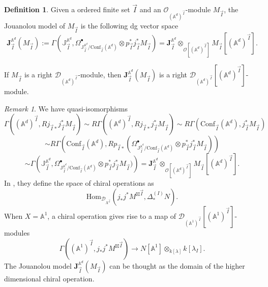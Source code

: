 \documentclass[11pt]{amsart}
\theoremstyle{definition}
\newtheorem{defn}[thm]{Definition}
\theoremstyle{remark}
\newtheorem{rem}[thm]{Remark}
\numberwithin{equation}{section}
\begin{document}
\begin{defn}
Given a ordered finite set $\vec{I}$ and an $\mathcal{O}_{(\mathbb{A}^d)^{\vec{I}}}$-module $M_{\vec{I}}$, the Jouanolou model of $M_{\vec{I}}$ is the following dg vector space
$$
\mathbf{J}^{\mathbb{A}^d}_{\vec{I}}(M_{\vec{I}}):=\Gamma\left(\mathbb{J}^{\mathbb{A}^d}_{\vec{I}},\Omega^{\bullet}_{\mathbb{J}^{\mathbb{A}^d}_{\vec{I}}/\mathrm{Conf}_{\vec{I}}(\mathbb{A}^d)}\otimes p^*_{\vec{I}}j^*_{\vec{I}}M_{\vec{I}} \right)=\mathbf{J}^{\mathbb{A}^d}_{\vec{I}}\otimes_{\mathcal{O}[(\mathbb{A}^d)^{\vec{I}}]}M_{\vec{I}}[(\mathbb{A}^d)^{\vec{I}}].
$$

If $M_{\vec{I}}$ is a right $\mathcal{D}_{(\mathbb{A}^d)^{\vec{I}}}$-module, then $\mathbf{J}^{\mathbb{A}^d}_{\vec{I}}(M_{\vec{I}})$ is a right $\mathcal{D}_{(\mathbb{A}^d)^{\vec{I}}}[(\mathbb{A}^d)^{\vec{I}}]$-module.
\end{defn}

\begin{rem}
    We have quasi-isomorphisms
    $$
\Gamma\left((\mathbb{A}^d)^{\vec{I}},Rj_{\vec{I}*}j^*_{\vec{I}}M_{\vec{I}}\right)\sim R\Gamma\left((\mathbb{A}^d)^{\vec{I}},Rj_{\vec{I}*}j^*_{\vec{I}}M_{\vec{I}}\right)\sim R\Gamma\left(\mathrm{Conf}_{\vec{I}}(\mathbb{A}^d),j^*_{\vec{I}}M_{\vec{I}}\right)
    $$
    $$
    \sim R\Gamma\left(\mathrm{Conf}_{\vec{I}}(\mathbb{A}^d),Rp_{\vec{I}*}(\Omega^{\bullet}_{\mathbb{J}^{\mathbb{A}^d}_{\vec{I}}/\mathrm{Conf}_{\vec{I}}(\mathbb{A}^d)}\otimes p^*_{\vec{I}}j^*_{\vec{I}}M_{\vec{I}})\right)
    $$
    $$
    \sim \Gamma\left(\mathbb{J}^{\mathbb{A}^d}_{\vec{I}},\Omega^{\bullet}_{\mathbb{J}^{\mathbb{A}^d}_{\vec{I}}/\mathrm{Conf}_{\vec{I}}(\mathbb{A}^d)}\otimes p^*_{\vec{I}}j^*_{\vec{I}}M_{\vec{I}}) \right)=\mathbf{J}^{\mathbb{A}^d}_{\vec{I}}\otimes_{\mathcal{O}[(\mathbb{A}^d)^{\vec{I}}]}M_{\vec{I}}[(\mathbb{A}^d)^{\vec{I}}].
    $$
    In \cite{beilinson2004chiral}, they define the space of chiral operations as
    $$
    \mathrm{Hom}_{\mathcal{D}_{X^{\vec{I}}}}\left(j_{*}j^*M^{\boxtimes\vec{I}},\Delta^{(I)}_*N\right).
    $$
    When $X=\mathbb{A}^1$, a chiral operation gives rise to a map of $\mathcal{D}_{(\mathbb{A}^1)^{\vec{I}}}[(\mathbb{A}^1)^{\vec{I}}]$-modules
    $$
    \Gamma\left((\mathbb{A}^1)^{\vec{I}},j_{*}j^*M^{\boxtimes\vec{I}}\right)\rightarrow N[\mathbb{A}^1]\otimes_{k[\lambda]}k[\lambda_I].
    $$
    The Jouanolou model $\mathbf{J}^{\mathbb{A}^d}_{\vec{I}}(M_{\vec{I}})$ can be thought as the domain of the higher dimensional chiral operation.
\end{rem}
\end{document}
